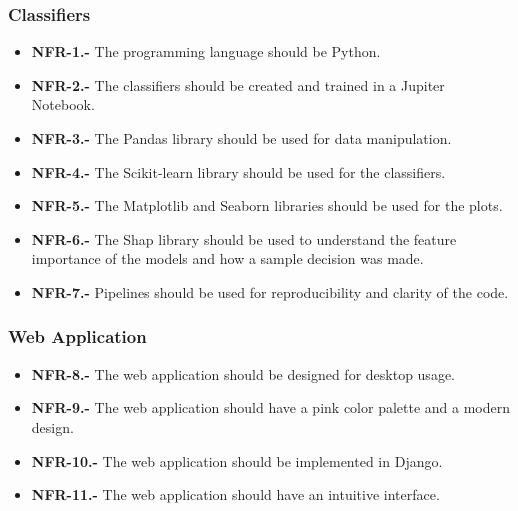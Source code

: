 \subsubsection{Classifiers}

\begin{itemize}
    \item \textbf{NFR-1.-} The programming language should be Python.
    \item \textbf{NFR-2.-} The classifiers should be created and trained in a Jupiter Notebook.
    \item \textbf{NFR-3.-} The Pandas library should be used for data manipulation.
    \item \textbf{NFR-4.-} The Scikit-learn library should be used for the classifiers.
    \item \textbf{NFR-5.-} The Matplotlib and Seaborn libraries should be used for the plots.
    \item \textbf{NFR-6.-} The Shap library should be used to understand the feature importance of the models and how a sample decision was made.
    \item \textbf{NFR-7.-} Pipelines should be used for reproducibility and clarity of the code.
\end{itemize}

\subsubsection{Web Application}

\begin{itemize}
    \item \textbf{NFR-8.-} The web application should be designed for desktop usage.
    \item \textbf{NFR-9.-} The web application should have a pink color palette and a modern design.
    \item \textbf{NFR-10.-} The web application should be implemented in Django.
    \item \textbf{NFR-11.-} The web application should have an intuitive interface.
\end{itemize}